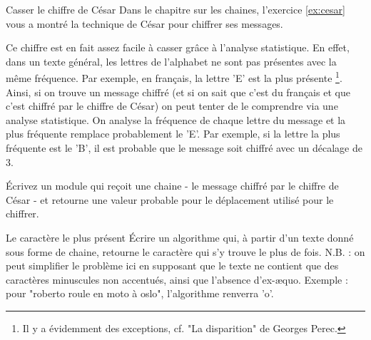 \begin{Exercice}{Casser le chiffre de César}
	Dans le chapitre sur les chaines, l'exercice \vref{ex:cesar}
	vous a montré la technique de César pour chiffrer ses messages.
	
	Ce chiffre est en fait assez facile à casser grâce à l'analyse statistique.
	En effet, dans un texte général, les lettres de l'alphabet ne sont pas
	présentes avec la même fréquence. 
	Par exemple, en français, la lettre 'E' est la plus présente%
	\footnote{%
		Il y a évidemment des exceptions, cf. "La disparition" de Georges Perec.
	}.
	Ainsi, si on trouve un message chiffré 
	(et si on sait que c'est du français et que c'est chiffré par le chiffre de César)
	on peut tenter de le comprendre via une analyse statistique. 
	On analyse la fréquence de chaque lettre du message et la plus fréquente remplace
	probablement le 'E'. Par exemple, si la lettre la plus fréquente est le 'B',
	il est probable que le message soit chiffré avec un décalage de 3.
	
	Écrivez un module qui reçoit une chaine 
	- le message chiffré par le chiffre de César -
	et retourne une valeur probable pour le déplacement utilisé pour le chiffrer.
\end{Exercice}

\begin{Exercice}{Le caractère le plus présent}
	Écrire un algorithme qui,
	à partir d’un texte donné sous forme de chaine, 
	retourne le caractère qui s’y trouve le plus de fois. 
	N.B. : on peut simplifier le problème ici 
	en supposant que le texte ne contient 
	que des caractères minuscules non accentués, 
	ainsi que l’absence d’ex-\ae{}quo. 
	Exemple : pour "roberto roule en moto à oslo", 
	l’algorithme renverra 'o'.
\end{Exercice}
